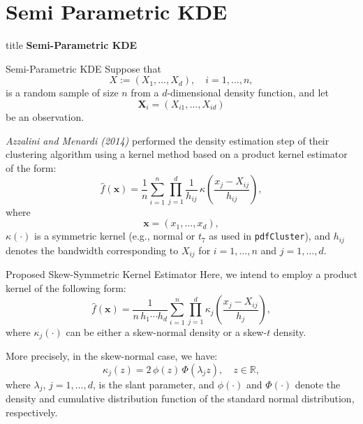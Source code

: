\section{Semi Parametric KDE}
\begin{frame}{\hspace{3cm}}
\centering

\vspace{1.5cm}

\begin{beamercolorbox}[sep=20pt,center,rounded=true,shadow=true]{title}
    {\fontsize{20}{24}\selectfont \textbf{Semi-Parametric KDE}}
\end{beamercolorbox}

\vspace{0.8cm}


\vfill

\end{frame}
\begin{frame}{Semi-Parametric KDE}
Suppose that 
\[
X := (X_1, \ldots, X_d), \quad i = 1, \ldots, n,
\]
is a random sample of size $n$ from a $d$-dimensional density function, and let 
\[
\mathbf{X}_i = (X_{i1}, \ldots, X_{id})
\]
be an observation.

\textit{Azzalini and Menardi (2014)} performed the density estimation step of their clustering algorithm using a kernel method based on a product kernel estimator of the form:
\begin{equation}
\hat{f}(\mathbf{x}) = \frac{1}{n} \sum_{i=1}^{n} \prod_{j=1}^{d} \frac{1}{h_{ij}} \, \kappa\!\left( \frac{x_j - X_{ij}}{h_{ij}} \right),
\end{equation}
where
\[
\mathbf{x} = (x_1, \ldots, x_d),
\]
$\kappa(\cdot)$ is a symmetric kernel (e.g., normal or $t_7$ as used in \texttt{pdfCluster}), and $h_{ij}$ denotes the bandwidth corresponding to $X_{ij}$ for $i = 1, \ldots, n$ and $j = 1, \ldots, d$.
    
\end{frame}
\begin{frame}{Proposed Skew-Symmetric Kernel Estimator}
Here, we intend to employ a product kernel of the following form:
\begin{equation}
\hat{f}(\mathbf{x}) = \frac{1}{n \, h_1 \cdots h_d} \sum_{i=1}^{n} \prod_{j=1}^{d} 
\kappa_j \!\left( \frac{x_j - X_{ij}}{h_j} \right),
\end{equation}
where $\kappa_j(\cdot)$ can be either a skew-normal density or a skew-$t$ density.

More precisely, in the skew-normal case, we have:
\begin{equation}
\kappa_j(z) = 2 \, \phi(z)\, \Phi(\lambda_j z), \quad z \in \mathbb{R},
\end{equation}
where $\lambda_j$, $j = 1, \ldots, d$, is the slant parameter, and $\phi(\cdot)$ and $\Phi(\cdot)$ denote the density and cumulative distribution function of the standard normal distribution, respectively.
    
\end{frame}
